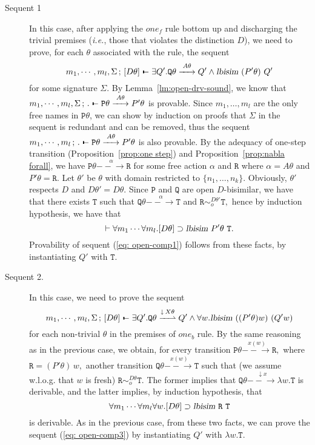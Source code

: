 \documentclass{acmtrans2m}
\newcommand{\ie}{{\em i.e.}}
\def\Ppi{{\mathtt P}}
\def\Qpi{{\mathtt Q}}
\def\Rpi{{\mathtt R}}
\def\Tpi{{\mathtt T}}
\def\relbar{\mathrel{\smash-}}
\def\joinrelm{\mathrel{\mkern-3.2mu}}
\def\tailpiece{\kern 1pt\vrule height 1ex width 0.3ex depth -.25ex}
\def\seqsym{\mathrel{\tailpiece\joinrelm\relbar}}
\newcommand{\NSeq}[3]{#1\,;\,#2 \seqsym #3}
\newcommand{\lbisim}[2]{\hbox{\sl lbisim}~#1~#2}
\newcommand{\inact}{\mathop{\downarrow}}
\newcommand{\oimp}{\supset}
\newcommand{\one  }[3]{#1\stackrel{#2}{-\!\!-\!\!\!\rightarrow    } #3}
\newcommand{\onep }[3]{#1\stackrel{#2}{-\!\!-\!\!\!\rightharpoonup} #3}
\begin{document}
\begin{description}
\item[Sequent 1] In this case, after applying the $one_f$ rule bottom up
and discharging the trivial premises (\ie, those that violates the distinction $D$), 
we need to prove, for each $\theta$ associated with the rule, the sequent
\begin{equation}
\label{eq: open-comp1}
\NSeq{m_1, \cdots, m_l, \Sigma}{[D\theta]}{\exists Q'. \one{\Qpi\theta}{A\theta}{Q'}
\land \lbisim{(P'\theta)}{Q'}}
\end{equation}
for some signature $\Sigma.$  
By Lemma~\ref{lm:open-drv-sound}, we know that 
$\NSeq{m_1,\cdots, m_l, \Sigma}{.}{\one{\Ppi\theta}{A\theta}{P'\theta}}$ is provable.
Since $m_1, \ldots, m_l$ are the only free names in $\Ppi\theta$, we can show by
induction on proofs that $\Sigma$ in the sequent is redundant and can be removed,
thus the sequent
$\NSeq{m_1,\cdots, m_l}{.}{\one{\Ppi\theta}{A\theta}{P'\theta}}$ is also provable.
By the adequacy of one-step transition (Proposition~\ref{prop:one step})
and Proposition~\ref{prop:nabla forall}, we have
$\one{\Ppi\theta}{\alpha}{\Rpi}$ for some free action $\alpha$ and $\Rpi$
where $\alpha = A\theta$ and $P'\theta = \Rpi.$
Let $\theta'$ be $\theta$ with domain restricted to $\{n_1, \ldots, n_k \}.$
Obviously, $\theta'$ respects $D$ and $D\theta' = D\theta.$
Since $\Ppi$ and $\Qpi$ are open $D$-bisimilar, we have that
there exists $\Tpi$ such that $\one{\Qpi\theta}{\alpha}{\Tpi}$
and $\Rpi \sim_o^{D\theta'} \Tpi,$ hence by induction hypothesis, we have that
\begin{equation}
\label{eq: open-comp2}
\vdash \forall m_1 \cdots \forall m_l. [D\theta] \oimp \lbisim {P'\theta}{\Tpi}.
\end{equation}
Provability of sequent (\ref{eq: open-comp1}) follows from these facts,
by instantiating $Q'$ with $\Tpi.$

\item[Sequent 2.]
In this case, we need to prove the sequent
\begin{equation}
\label{eq: open-comp3}
\NSeq{m_1, \cdots, m_l, \Sigma}{[D\theta]}{\exists Q'. \onep{\Qpi\theta}{\inact {X\theta}}{Q'}
\land \forall w. \lbisim{((P'\theta) w)}{(Q' w)}}
\end{equation}
for each non-trivial $\theta$ in the premises of $one_b$ rule. 
By the same reasoning as in the previous case, we obtain, for every transition
$
\one{\Ppi\theta}{x(w)}{\Rpi},
$
where $\Rpi = (P'\theta)\,w,$ another transition
$
\one{\Qpi\theta}{x(w)}{\Tpi}
$
such that (we assume w.l.o.g. that $w$ is fresh)
$
\Rpi \sim_o^{D\theta}  \Tpi.
$
The former implies that $\one{\Qpi\theta}{\inact x}{\lambda w. \Tpi}$ is derivable, and the latter
implies, by induction hypothesis, that 
$$
\forall m_1 \cdots \forall m_l \forall w. [D\theta] \oimp \lbisim {\Rpi}{\Tpi}
$$
is derivable. 
As in the previous case, from these two facts, we can prove the sequent (\ref{eq: open-comp3})
by instantiating $Q'$ with $\lambda w.\Tpi$.



\end{description}
\end{document}
